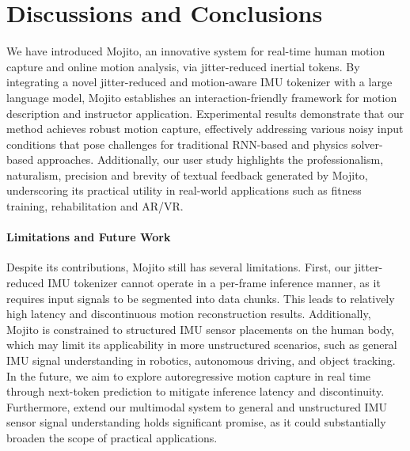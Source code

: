 \section{Discussions and Conclusions}
We have introduced Mojito, an innovative system for real-time human motion capture and online motion analysis, via jitter-reduced inertial tokens. By integrating a novel jitter-reduced and motion-aware IMU tokenizer with a large language model, Mojito establishes an interaction-friendly framework for motion description and instructor application. Experimental results demonstrate that our method achieves robust motion capture, effectively addressing various noisy input conditions that pose challenges for traditional RNN-based and physics solver-based approaches. Additionally, our user study highlights the professionalism, naturalism, precision and brevity of textual feedback generated by Mojito, underscoring its practical utility in real-world applications such as fitness training, rehabilitation and AR/VR.

\vspace{-4mm}
\paragraph{Limitations and Future Work}
Despite its contributions, Mojito still has several limitations. First, our jitter-reduced IMU tokenizer cannot operate in a per-frame inference manner, as it requires input signals to be segmented into data chunks. This leads to relatively high latency and discontinuous motion reconstruction results. Additionally, Mojito is constrained to structured IMU sensor placements on the human body, which may limit its applicability in more unstructured scenarios, such as general IMU signal understanding in robotics, autonomous driving, and object tracking.
In the future, we aim to explore autoregressive motion capture in real time through next-token prediction to mitigate inference latency and discontinuity. 
Furthermore, extend our multimodal system to general and unstructured IMU sensor signal understanding holds significant promise, as it could substantially broaden the scope of practical applications.